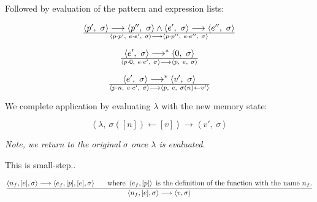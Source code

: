 Followed by evaluation of the pattern and expression lists:

\begin{equation}
{
\left\langle p',\ \sigma\right\rangle
\longrightarrow
\left\langle p'',\ \sigma\right\rangle
\wedge
\left\langle e',\ \sigma\right\rangle
\longrightarrow
\left\langle e'',\ \sigma\right\rangle
}\over{
\left\langle p\cdot p',\ e\cdot e',\ \sigma\right\rangle
\longrightarrow
\left\langle p\cdot p'',\ e\cdot e'',\ \sigma\right\rangle
}
\end{equation}

\begin{equation}
{
\left\langle e',\ \sigma\right\rangle
\longrightarrow^*
\left\langle 0,\ \sigma\right\rangle
}\over{
\left\langle p\cdot 0,\ e\cdot e',\ \sigma\right\rangle
\longrightarrow
\left\langle p,\ e,\ \sigma\right\rangle
}
\end{equation}

\begin{equation}
{
\left\langle e',\ \sigma\right\rangle
\longrightarrow^*
\left\langle v',\ \sigma\right\rangle
}\over{
\left\langle p\cdot n,\ e\cdot e',\ \sigma\right\rangle
\longrightarrow
\left\langle p,\ e,\ \sigma(n)\leftarrow v' \right\rangle
}
\end{equation}




We complete application by evaluating $\lambda$ with the new memory state:

\begin{equation}
\left\langle \lambda,\ \sigma([n])\leftarrow[v]\right\rangle
\longrightarrow
\left\langle v',\ \sigma\right\rangle
\end{equation}

\emph{Note, we return to the original $\sigma$ once $\lambda$ is evaluated.}

\newpage

This is small-step..

\begin{equation}
{
\left\langle n_f, [e], \sigma\right\rangle
\longrightarrow
\left\langle e_f, [p], [e], \sigma\right\rangle
\ \ \ \ \ \text{where}\ \left\langle e_f, [p] \right\rangle
\ \text{is the definition of the function with the name}\ n_f\text{.}
\over
\left\langle n_f, [e], \sigma\right\rangle
\longrightarrow
\left\langle v, \sigma\right\rangle
}
\end{equation}
